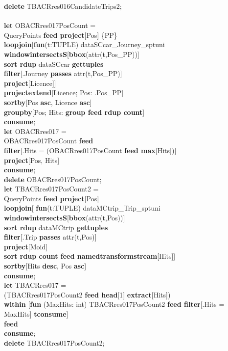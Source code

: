 \documentclass[a4paper]{article}
\newcommand{\op}[1]{\textbf{#1}}
\begin{document}
\begin{scriptsize}
\begin{tabbing}
\op{delete} TBACRres016CandidateTrips2;\\
\\
\op{let} OBACRres017PosCount =\\
\>QueryPoints \op{feed project}[Pos] \{PP\}\\
\>\op{loopjoin}[\op{fun}(t:TUPLE) dataSCcar\_Journey\_sptuni \op{windowintersectsS}[\op{bbox}(attr(t,Pos\_PP))]\\
\>\>\op{sort rdup} dataSCcar \op{gettuples}\\
\>\>\op{filter}[.Journey \op{passes} attr(t,Pos\_PP)]\\
\>\>\op{project}[Licence]]\\
\>\op{projectextend}[Licence; Pos: .Pos\_PP]\\
\>\op{sortby}[Pos \op{asc}, Licence \op{asc}]\\
\>\op{groupby}[Pos; Hits: \op{group feed rdup count}]\\
\op{consume};\\
\op{let} OBACRres017 =\\
\>OBACRres017PosCount \op{feed}\\
\>\op{filter}[.Hits = (OBACRres017PosCount \op{feed max}[Hits])]\\
\>\op{project}[Pos, Hits]\\
\op{consume};\\
\op{delete} OBACRres017PosCount;
\\
\op{let} TBACRres017PosCount2 =\\
\>QueryPoints \op{feed project}[Pos]\\
\>\op{loopjoin}[ \op{fun}(t:TUPLE) dataMCtrip\_Trip\_sptuni \op{windowintersectsS}[\op{bbox}(attr(t,Pos))]\\
\>\>\op{sort rdup} dataMCtrip \op{gettuples}\\
\>\>\op{filter}[.Trip \op{passes} attr(t,Pos)]\\
\>\>\op{project}[Moid]\\
\>\>\op{sort rdup count feed namedtransformstream}[Hits]]\\
\>\op{sortby}[Hits \op{desc}, Pos \op{asc}]\\
\op{consume};\\
\op{let} TBACRres017 =\\
\>(TBACRres017PosCount2 \op{feed head}[1] \op{extract}[Hits])\\
\>\>\op{within} [\op{fun} (MaxHits: int) TBACRres017PosCount2 \op{feed filter}[.Hits = MaxHits] \op{tconsume}]\\
\>\op{feed}\\
\op{consume};\\
\op{delete} TBACRres017PosCount2;\\
\end{tabbing}
\end{scriptsize}
\end{document}
